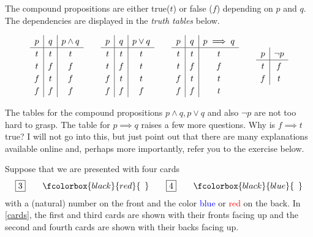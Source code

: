 \documentclass{article}
\begin{document}
The compound propositions are either true($t$) or false ($f$) depending on
$p$ and $q$. The dependencies are displayed in the \emph{truth tables} below.

\begin{equation*}[emph]
\def\arraystretch{1.2}
      \begin{array}{c|c|c}
        p & q  & p\land q  \\
        \hline 
        t & t  & t    \\
        t & f & f\\
        f & t & f\\
        f & f & f
      \end{array}\qquad
      \begin{array}{c|c|c}
        p & q  & p\lor q  \\
        \hline
        t & t  & t    \\
        t & f & t\\
        f & t & t\\
        f & f & f
      \end{array}
      \qquad
      \begin{array}{c|c|c}
        p & q  & p\implies q  \\
        \hline
        t & t  & t    \\
        t & f & f\\
        f & t & t\\
        f & f & t
      \end{array}\qquad
      \begin{array}{c|c}
        p & \neg p \\
        \hline
        t & f\\
        f & t
      \end{array}
  \end{equation*}


The tables for the compound propositions $p\land q, p\lor q$ and also
$\neg p$ are not too hard to grasp. The table for $p\implies q$ 
raises a few more questions. Why is $f\implies t$ true?
I will not go into this, but just point out that there are
many explanations available online and, 
perhaps more importantly, refer you to the exercise below.



\beginshex
Suppose that we are presented with four cards
\begin{equation}\label{cards}
\boxed{3}\qquad \fcolorbox{black}{red}{\phantom{3}}
\qquad\boxed{4}\qquad \fcolorbox{black}{blue}{\phantom{4}}
\end{equation}
with a (natural) number on the front and the color
\textcolor{blue}{blue} or \textcolor{red}{red} on the back.
In \eqref{cards}, the first and third cards are shown with their fronts facing up and
the second and fourth cards are shown with their backs facing up.
\end{document}

